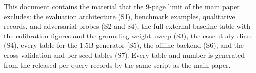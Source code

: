 \renewcommand{\thesection}{S\arabic{section}}
\renewcommand{\thetable}{S\arabic{table}}
\renewcommand{\thefigure}{S\arabic{figure}}

\maketitle

This document contains the material that the 9-page limit of the main paper excludes: the evaluation architecture (S1), benchmark examples, qualitative records, and adversarial probes (S2 and S4), the full external-baseline table with the calibration figures and the grounding-weight sweep (S3), the case-study slices (S4), every table for the 1.5B generator (S5), the offline backend (S6), and the cross-validation and per-seed tables (S7). Every table and number is generated from the released per-query records by the same script as the main paper.

